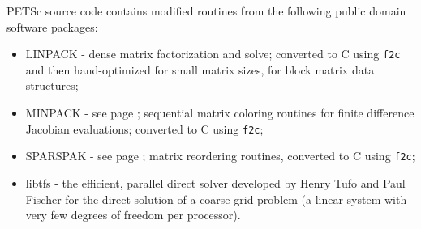\vspace{.3in}
\noindent
PETSc source code contains modified routines from the following public domain software packages:
\begin{itemize}
  \item LINPACK -    dense matrix factorization and solve; converted to C using {\tt f2c} and then
                     hand-optimized for small matrix sizes, for block matrix data structures;
  \item MINPACK -    see page \pageref{sec_fdmatrix}; sequential matrix coloring routines for finite difference Jacobian
                     evaluations; converted to C using {\tt f2c};
  \item SPARSPAK -   see page \pageref{sec_factorization}; matrix reordering routines, converted to C using {\tt f2c};
  \item libtfs     - the efficient, parallel direct solver developed by Henry Tufo and Paul Fischer for the direct solution of a coarse grid problem
                     (a linear system with very few degrees of freedom per processor).
\end{itemize}


